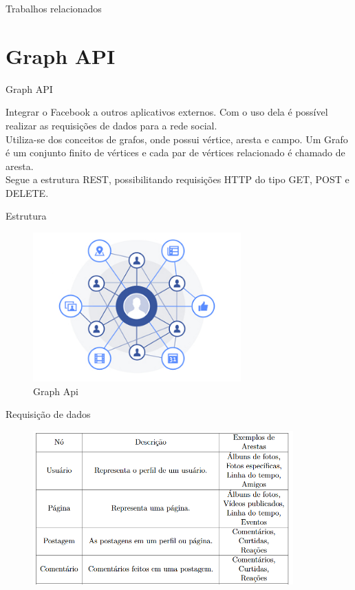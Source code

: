 \documentclass{aula-ifb}
\begin{document}
\begin{frame}{Trabalhos relacionados}

\end{frame}

\section{Graph API}
\begin{frame}{Graph API}
	\begin{center}
	Integrar o Facebook a outros aplicativos externos. Com o uso dela é possível realizar as requisições de dados para a rede social.\\
	\vspace{20px}
	Utiliza-se dos conceitos de grafos, onde possui vértice, aresta e campo. Um Grafo é um conjunto finito de vértices e cada par de vértices relacionado é chamado de aresta. \\
	\vspace{20px}
	Segue a estrutura REST, possibilitando requisições HTTP do tipo GET, POST e DELETE. 
	\end{center}
\end{frame}

\begin{frame}{Estrutura}
	\begin{figure}[h]
		\includegraphics[width=8cm]{figuras/facebookgraph.png}
		\caption{Graph Api \cite{figura3}}
		\label{fig:facebookgraph}
	\end{figure}
\end{frame}

\begin{frame}{Requisição de dados}
\begin{figure}[h]
\includegraphics[width=10cm]{figuras/nosarestas.png}
\label{fig:facebookgraph}
\end{figure}
\end{frame}
\end{document}
